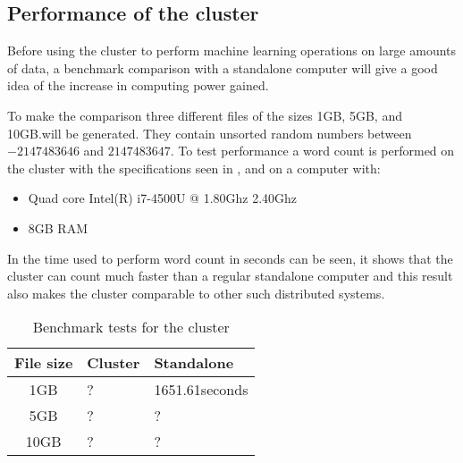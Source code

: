 \subsection{Performance of the cluster}\label{sec:benchmark}
Before using the cluster to perform machine learning operations on large amounts of data, a benchmark comparison with a standalone computer will give a good idea of the increase in computing power gained.

To make the comparison three different files of the sizes 1GB, 5GB, and 10GB.\@ will be generated. They contain unsorted random numbers between $-2147483646$ and $2147483647$. To test performance a word count is performed on the cluster with the specifications seen in , and on a computer with:
\begin{itemize}
\item Quad core Intel(R) i7-4500U @ 1.80Ghz 2.40Ghz
\item 8GB RAM
\end{itemize}

In  the time used to perform word count in seconds can be seen, it shows that the cluster can count much faster than a regular standalone computer and this result also makes the cluster comparable to other such distributed systems.

\begin{table}[!htb]
  \centering
  \begin{tabular}{|c|ll|}
    \hline
    File size & Cluster  & Standalone \\
    \hline
    1GB & ? & 1651.61seconds \\
    5GB & ? & ? \\
    10GB & ? & ? \\
    \hline
  \end{tabular}
  \caption{Benchmark tests for the cluster}
  \label{tab:bench}
\end{table}




